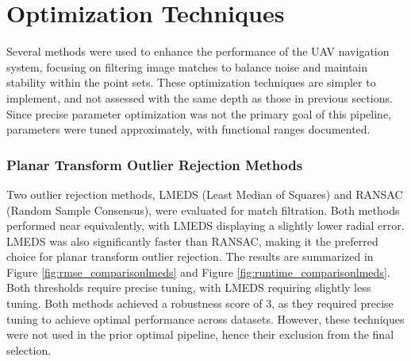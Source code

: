 \vspace{-0.5cm}
\section{Optimization Techniques}
\vspace{-0.25cm}

Several methods were used to enhance the performance of the UAV navigation system, focusing on filtering image matches to balance noise and maintain stability within the point sets. These optimization techniques are simpler to implement, and not assessed with the same depth as those in previous sections. Since precise parameter optimization was not the primary goal of this pipeline, parameters were tuned approximately, with functional ranges documented.




\subsubsection*{Planar Transform Outlier Rejection Methods}

Two outlier rejection methods, LMEDS (Least Median of Squares) and RANSAC (Random Sample Consensus), were evaluated for match filtration. Both methods performed near equivalently, with LMEDS displaying a slightly lower radial error. LMEDS was also significantly faster than RANSAC, making it the preferred choice for planar transform outlier rejection. The results are summarized in Figure \ref{fig:rmse_comparisonlmeds} and Figure \ref{fig:runtime_comparisonlmeds}. Both thresholds require precise tuning, with LMEDS requiring slightly less tuning. Both methods achieved a robustness score of 3, as they required precise tuning to achieve optimal performance across datasets. However, these techniques were not used in the prior optimal pipeline, hence their exclusion from the final selection.

